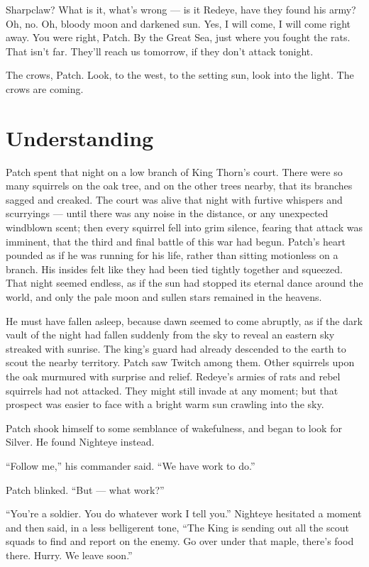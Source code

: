 \documentclass[ebook,oneside,openany,17pt]{memoir}
\renewcommand{\thechapter}{\Roman{chapter}}
\newcounter{sections}
\newcommand{\sections}[1]{%
  \section*{#1}
  \addtocounter{sections}{1}%
  \pdfbookmark[1]{#1}{section.\thechapter.\thesections}}
\begin{document}
Sharpclaw? What is it, what’s wrong — is it Redeye, have they found
his army? Oh, no. Oh, bloody moon and darkened sun. Yes, I will come,
I will come right away. You were right, Patch. By the Great Sea, just
where you fought the rats. That isn’t far. They’ll reach us tomorrow,
if they don’t attack tonight.

The crows, Patch. Look, to the west, to the setting sun, look into the
light. The crows are coming.


\sections{Understanding}

Patch spent that night on a low branch of King Thorn’s court. There
were so many squirrels on the oak tree, and on the other trees nearby,
that its branches sagged and creaked. The court was alive that night
with furtive whispers and scurryings — until there was any noise in
the distance, or any unexpected windblown scent; then every squirrel
fell into grim silence, fearing that attack was imminent, that the
third and final battle of this war had begun. Patch’s heart pounded as
if he was running for his life, rather than sitting motionless on a
branch. His insides felt like they had been tied tightly together and
squeezed. That night seemed endless, as if the sun had stopped its
eternal dance around the world, and only the pale moon and sullen
stars remained in the heavens.

He must have fallen asleep, because dawn seemed to come abruptly, as
if the dark vault of the night had fallen suddenly from the sky to
reveal an eastern sky streaked with sunrise. The king’s guard had
already descended to the earth to scout the nearby territory. Patch
saw Twitch among them. Other squirrels upon the oak murmured with
surprise and relief. Redeye’s armies of rats and rebel squirrels had
not attacked. They might still invade at any moment; but that prospect
was easier to face with a bright warm sun crawling into the sky.

Patch shook himself to some semblance of wakefulness, and began to
look for Silver. He found Nighteye instead.

“Follow me,” his commander said. “We have work to do.”

Patch blinked. “But — what work?”

“You’re a soldier. You do whatever work I tell you.” Nighteye
hesitated a moment and then said, in a less belligerent tone, “The
King is sending out all the scout squads to find and report on the
enemy. Go over under that maple, there’s food there. Hurry. We leave
soon.”
\end{document}
